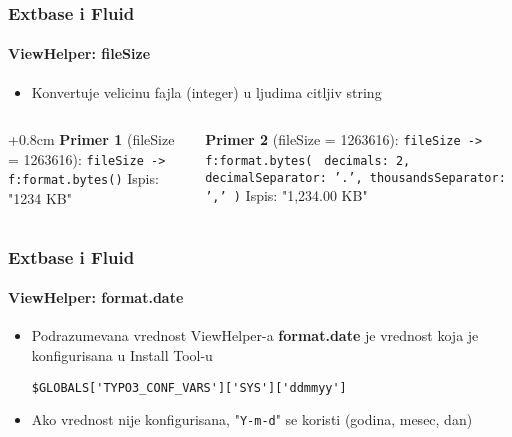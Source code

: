 \begin{frame}[fragile]
	\frametitle{Extbase i Fluid}
	\framesubtitle{ViewHelper: fileSize}

	\begin{itemize}
		\item Konvertuje velicinu fajla (integer) u ljudima citljiv string\newline
	\end{itemize}

	\begin{columns}[T]

		\begin{column}{.5\textwidth}
			\advance\leftskip+0.8cm
			\smaller
				\textbf{Primer 1} (fileSize = 1263616):\newline
				\texttt{fileSize -> f:format.bytes()}\newline
				\newline
				Ispis: "1234 KB"
			\normalsize
		\end{column}
		\begin{column}{.5\textwidth}
			\smaller
				\textbf{Primer 2} (fileSize = 1263616):\newline
				\texttt{fileSize -> f:format.bytes(}\newline
				\texttt{
				decimals: 2,\newline
				decimalSeparator: '.',\newline
				thousandsSeparator: ','\newline
				)}\newline
				\newline
				Ispis: "1,234.00 KB"
			\normalsize
		\end{column}

	\end{columns}

\end{frame}


\begin{frame}[fragile]
	\frametitle{Extbase i Fluid}
	\framesubtitle{ViewHelper: format.date}

	\lstset{
		basicstyle=\smaller\ttfamily
	}

	\begin{itemize}
		\item Podrazumevana vrednost ViewHelper-a \textbf{format.date} je vrednost koja je konfigurisana u Install Tool-u

			\lstinline!$GLOBALS['TYPO3_CONF_VARS']['SYS']['ddmmyy']!

		\item Ako vrednost nije konfigurisana, "\texttt{Y-m-d}" se koristi (godina, mesec, dan)

	\end{itemize}

\end{frame}


